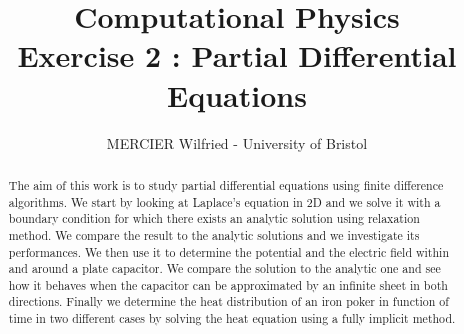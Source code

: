 \documentclass[10 pt]{article}
\numberwithin{equation}{section}
\begin{document}
\title{\LARGE \bf Computational Physics \\ Exercise 2 : Partial Differential Equations }
\author{MERCIER Wilfried  -  University of Bristol}

\maketitle


\begin{abstract}

The aim of this work is to study partial differential equations using finite difference algorithms. We start by looking at Laplace's equation in 2D and we solve it with a boundary condition for which there exists an analytic solution using relaxation method. We compare the result to the analytic solutions and we investigate its performances. We then use it to determine the potential and the electric field within and around a plate capacitor. We compare the solution to the analytic one and see how it behaves when the capacitor can be approximated by an infinite sheet in both directions.
Finally we determine the heat distribution of an iron poker in function of time in two different cases by solving the heat equation using a fully implicit method.

\end{abstract}
\end{document}

